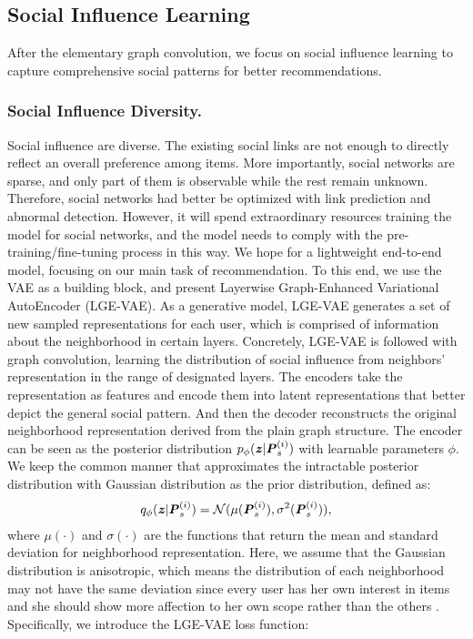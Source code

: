 \documentclass[letterpaper]{article} %
\begin{document}
\subsection{Social Influence Learning}
After the elementary graph convolution, we focus on social influence learning to capture comprehensive social patterns for better recommendations.

\subsubsection{Social Influence Diversity.}
Social influence are diverse. The existing social links are not enough to directly reflect an overall preference among items. More importantly, social networks are sparse, and only part of them is observable while the rest remain unknown. Therefore, social networks had better be optimized with link prediction and abnormal detection. However, it will spend extraordinary resources training the model for social networks, and the model needs to comply with the pre-training/fine-tuning process in this way. We hope for a lightweight end-to-end model, focusing on our main task of recommendation. To this end, we use the VAE \cite{VAE} as a building block, and present Layerwise Graph-Enhanced Variational AutoEncoder (LGE-VAE). As a generative model, LGE-VAE generates a set of new sampled representations for each user, which is comprised of information about the neighborhood in certain layers. Concretely, LGE-VAE is followed with graph convolution, learning the distribution of social influence from neighbors' representation in the range of designated layers. The encoders take the representation as features and encode them into latent representations that better depict the general social pattern. And then the decoder reconstructs the original neighborhood representation derived from the plain graph structure. The encoder can be seen as the posterior distribution $p_{\phi}(\textbf{\textit{z}}|\textbf{\textit{P}}_s^{(i)})$ with learnable parameters $\phi$. We keep the common manner that approximates the intractable posterior distribution with Gaussian distribution as the prior distribution, defined as:
\begin{align}[h]
    q_{\phi}(\textbf{\textit{z}}|\textbf{\textit{P}}_s^{(i)}) = \mathcal{N}(\mu(\textbf{\textit{P}}_s^{(i)}), \sigma^2(\textbf{\textit{P}}_s^{(i)})),
\end{align}
where $\mu(\cdot)$ and $\sigma(\cdot)$ are the functions that return the mean and standard deviation for neighborhood representation. Here, we assume that the Gaussian distribution is anisotropic, which means the distribution of each neighborhood may not have the same deviation since every user has her own interest in items and she should show more affection to her own scope rather than the others \cite{ESRF}. Specifically, we introduce the LGE-VAE loss function:
\end{document}
